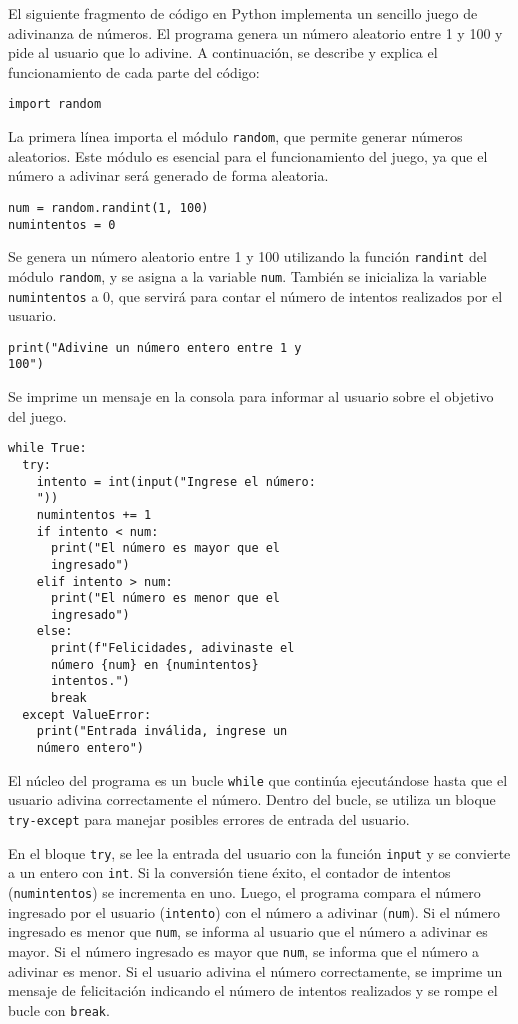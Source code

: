 \documentclass[conference]{IEEEtran}
\begin{document}
El siguiente fragmento de código en Python implementa un sencillo juego de adivinanza de números. El programa genera un número aleatorio entre 1 y 100 y pide al usuario que lo adivine. A continuación, se describe y explica el funcionamiento de cada parte del código:

\begin{verbatim}
import random
\end{verbatim}

La primera línea importa el módulo \texttt{random}, que permite generar números aleatorios. Este módulo es esencial para el funcionamiento del juego, ya que el número a adivinar será generado de forma aleatoria.

\begin{verbatim}
num = random.randint(1, 100)  
numintentos = 0  
\end{verbatim}

Se genera un número aleatorio entre 1 y 100 utilizando la función \texttt{randint} del módulo \texttt{random}, y se asigna a la variable \texttt{num}. También se inicializa la variable \texttt{numintentos} a 0, que servirá para contar el número de intentos realizados por el usuario.

\begin{verbatim}
print("Adivine un número entero entre 1 y
100")  
\end{verbatim}

Se imprime un mensaje en la consola para informar al usuario sobre el objetivo del juego.

\begin{verbatim}
while True: 
  try:  
    intento = int(input("Ingrese el número: 
    "))  
    numintentos += 1 
    if intento < num:  
      print("El número es mayor que el 
      ingresado")  
    elif intento > num: 
      print("El número es menor que el 
      ingresado")  
    else:  
      print(f"Felicidades, adivinaste el 
      número {num} en {numintentos} 
      intentos.")  
      break  
  except ValueError:  
    print("Entrada inválida, ingrese un 
    número entero") 
\end{verbatim}

El núcleo del programa es un bucle \texttt{while} que continúa ejecutándose hasta que el usuario adivina correctamente el número. Dentro del bucle, se utiliza un bloque \texttt{try-except} para manejar posibles errores de entrada del usuario.

En el bloque \texttt{try}, se lee la entrada del usuario con la función \texttt{input} y se convierte a un entero con \texttt{int}. Si la conversión tiene éxito, el contador de intentos (\texttt{numintentos}) se incrementa en uno. Luego, el programa compara el número ingresado por el usuario (\texttt{intento}) con el número a adivinar (\texttt{num}). Si el número ingresado es menor que \texttt{num}, se informa al usuario que el número a adivinar es mayor. Si el número ingresado es mayor que \texttt{num}, se informa que el número a adivinar es menor. Si el usuario adivina el número correctamente, se imprime un mensaje de felicitación indicando el número de intentos realizados y se rompe el bucle con \texttt{break}.
\end{document}

